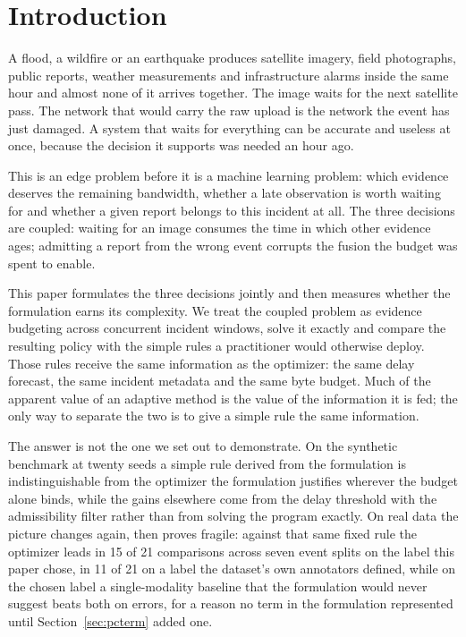 \documentclass[conference,a4paper]{IEEEtran}
\newif\ifsixpage
\begin{document}
\ifsixpage

\else
\section{Introduction}
A flood, a wildfire or an earthquake produces satellite imagery, field photographs, public reports, weather measurements and infrastructure alarms inside the same hour and almost none of it arrives together. The image waits for the next satellite pass. The network that would carry the raw upload is the network the event has just damaged. A system that waits for everything can be accurate and useless at once, because the decision it supports was needed an hour ago.

This is an edge problem before it is a machine learning problem: which evidence deserves the remaining bandwidth, whether a late observation is worth waiting for and whether a given report belongs to this incident at all. The three decisions are coupled: waiting for an image consumes the time in which other evidence ages; admitting a report from the wrong event corrupts the fusion the budget was spent to enable.

This paper formulates the three decisions jointly and then measures whether the formulation earns its complexity. We treat the coupled problem as evidence budgeting across concurrent incident windows, solve it exactly and compare the resulting policy with the simple rules a practitioner would otherwise deploy. Those rules receive the same information as the optimizer: the same delay forecast, the same incident metadata and the same byte budget. Much of the apparent value of an adaptive method is the value of the information it is fed; the only way to separate the two is to give a simple rule the same information.

The answer is not the one we set out to demonstrate. On the synthetic benchmark at twenty seeds a simple rule derived from the formulation is indistinguishable from the optimizer the formulation justifies wherever the budget alone binds, while the gains elsewhere come from the delay threshold with the admissibility filter rather than from solving the program exactly. On real data the picture changes again, then proves fragile: against that same fixed rule the optimizer leads in 15 of 21 comparisons across seven event splits on the label this paper chose, in 11 of 21 on a label the dataset's own annotators defined, while on the chosen label a single-modality baseline that the formulation would never suggest beats both on errors, for a reason no term in the formulation represented until Section~\ref{sec:pcterm} added one.
\end{document}
